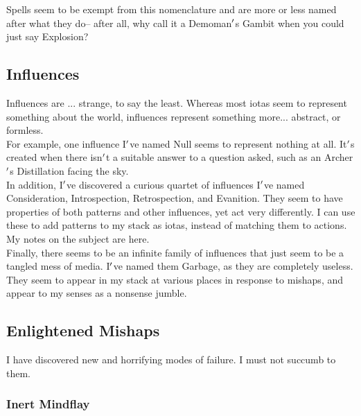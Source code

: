 \documentclass[12pt]{article}
\begin{document}
  
    Spells seem to be exempt from this nomenclature and are more or less named after what they do-- after all, why call it a Demoman$\rq$s Gambit when you could just say Explosion?\\

\newpage

\label{sec:casting/influences}
\subsection*{Influences}


  
    Influences are ... strange, to say the least. Whereas most iotas seem to represent something about the world, influences represent something more... abstract, or formless.\\For example, one influence I$\rq$ve named Null seems to represent nothing at all. It$\rq$s created when there isn$\rq$t a suitable answer to a question asked, such as an Archer$\rq$s Distillation facing the sky.\\


  
    In addition, I$\rq$ve discovered a curious quartet of influences I$\rq$ve named Consideration, Introspection, Retrospection, and Evanition. They seem to have properties of both patterns and other influences, yet act very differently. I can use these to add patterns to my stack as iotas, instead of matching them to actions. My notes on the subject are here.\\


  
    Finally, there seems to be an infinite family of influences that just seem to be a tangled mess of media. I$\rq$ve named them Garbage, as they are completely useless. They seem to appear in my stack at various places in response to mishaps, and appear to my senses as a nonsense jumble.\\

\newpage

\label{sec:casting/mishaps2}
\subsection*{Enlightened Mishaps}


  
    I have discovered new and horrifying modes of failure. I must not succumb to them.\\


  \subsubsection*{Inert Mindflay}
\end{document}
